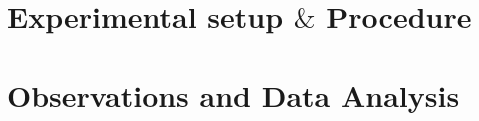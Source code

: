\documentclass{article}
\begin{document}
\begin{multicols}{2}
\section{Experimental setup $\&$ Procedure}
\section{Observations and Data Analysis}

\end{multicols}
\end{document}
